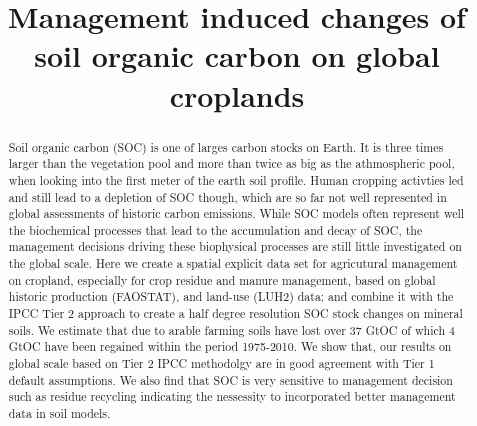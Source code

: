 \documentclass[gc, manuscript]{copernicus}
\begin{document}
\title{Management induced changes of soil organic carbon on global croplands}











\received{}
\pubdiscuss{} %
\revised{}
\accepted{}
\published{}




\maketitle


\begin{abstract}
Soil organic carbon (SOC) is one of larges carbon stocks on Earth. It is three times larger than the vegetation pool and more than twice as big as the athmospheric pool, when looking into the first meter of the earth soil profile. Human cropping activties led and still lead to a depletion of SOC though, which are so far not well represented in global assessments of historic carbon emissions. While SOC models often represent well the biochemical processes that lead to the accumulation and decay of SOC, the management decisions driving these biophysical processes are still little investigated on the global scale. Here we create a spatial explicit data set for agricutural management on cropland, especially for crop residue and manure management, based on global historic production (FAOSTAT), and land-use (LUH2) data; and combine it with the IPCC Tier 2 approach to create a half degree resolution SOC stock changes on mineral soils. We estimate that due to arable farming soils have lost over 37 GtOC of which 4 GtOC have been regained within the period 1975-2010. We show that, our results on global scale based on Tier 2 IPCC methodolgy are in good agreement with Tier 1 default assumptions. We also find that SOC is very sensitive to management decision such as residue recycling indicating the nessessity to incorporated better management data in soil models.
\end{abstract}
\end{document}
